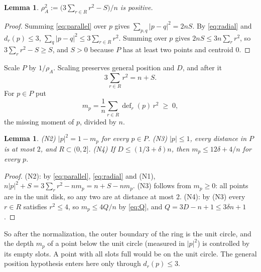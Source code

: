 \documentclass[11pt]{article}
\newtheorem{lemma}[theorem]{Lemma}
\theoremstyle{remark}
\begin{document}
\begin{lemma}\label{lem:rho}
$\rho_A^2 := \bigl(3\sum_{r \in R} r^2 - S\bigr)/n$ is positive.
\end{lemma}

\begin{proof}
Summing \eqref{eq:parallel} over $p$ gives $\sum_{p,q}|p-q|^2 = 2nS$. By
\eqref{eq:radial} and $d_r(p) \le 3$,
$\sum_q |p-q|^2 \le 3\sum_{r\in R} r^2$. Summing over $p$ gives
$2nS \le 3n\sum_r r^2$, so $3\sum_r r^2 - S \ge S$, and $S > 0$ because
$P$ has at least two points and centroid $0$.
\end{proof}

Scale $P$ by $1/\rho_A$. Scaling preserves general position and $D$, and
after it
\begin{equation}\tag{N1}
  3\sum_{r\in R} r^2 = n + S .
\end{equation}
For $p \in P$ put
\[
  m_p = \frac1n\sum_{r \in R}\operatorname{def}_r(p)\,r^2 \;\ge\; 0,
\]
the missing moment of $p$, divided by $n$.

\begin{lemma}\label{lem:annulus}
(N2) $|p|^2 = 1 - m_p$ for every $p \in P$. (N3) $|p| \le 1$, every
distance in $P$ is at most $2$, and $R \subset (0,2]$. (N4) If
$D \le (1/3+\delta)n$, then $m_p \le 12\delta + 4/n$ for every $p$.
\end{lemma}

\begin{proof}
(N2): by \eqref{eq:parallel}, \eqref{eq:radial} and (N1),
$n|p|^2 + S = 3\sum_r r^2 - n m_p = n + S - n m_p$. (N3) follows from
$m_p \ge 0$: all points are in the unit disk, so any two are at distance
at most $2$. (N4): by (N3) every $r \in R$ satisfies $r^2 \le 4$, so
$m_p \le 4Q/n$ by \eqref{eq:Q}, and $Q = 3D - n + 1 \le 3\delta n + 1$.
\end{proof}

So after the normalization, the outer boundary of the ring is the unit
circle, and the depth $m_p$ of a point below the unit circle (measured in
$|p|^2$) is controlled by its empty slots. A point with all slots full
would be on the unit circle. The general position hypothesis enters here
only through $d_r(p) \le 3$.
\end{document}

